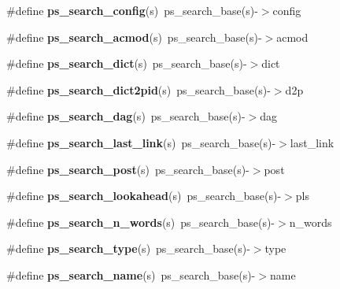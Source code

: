 \begin{DoxyCompactItemize}
\item 
\#define {\bfseries ps\-\_\-search\-\_\-config}(s)~ps\-\_\-search\-\_\-base(s)-\/$>$config\label{pocketsphinx__internal_8h_a856f984d97ce3d4ac640f1a9061065cf}

\item 
\#define {\bfseries ps\-\_\-search\-\_\-acmod}(s)~ps\-\_\-search\-\_\-base(s)-\/$>$acmod\label{pocketsphinx__internal_8h_a03b1edeb67c83451296c2d99b22621a9}

\item 
\#define {\bfseries ps\-\_\-search\-\_\-dict}(s)~ps\-\_\-search\-\_\-base(s)-\/$>$dict\label{pocketsphinx__internal_8h_ae2aad02cace01fbb2f345a0ead69c672}

\item 
\#define {\bfseries ps\-\_\-search\-\_\-dict2pid}(s)~ps\-\_\-search\-\_\-base(s)-\/$>$d2p\label{pocketsphinx__internal_8h_a5c91d7c3f11ba5b938705d1fe65676f9}

\item 
\#define {\bfseries ps\-\_\-search\-\_\-dag}(s)~ps\-\_\-search\-\_\-base(s)-\/$>$dag\label{pocketsphinx__internal_8h_a90e5addd9875c355d99208246802f7d8}

\item 
\#define {\bfseries ps\-\_\-search\-\_\-last\-\_\-link}(s)~ps\-\_\-search\-\_\-base(s)-\/$>$last\-\_\-link\label{pocketsphinx__internal_8h_a9ae7d942e4206b4184cc073a87d2dc82}

\item 
\#define {\bfseries ps\-\_\-search\-\_\-post}(s)~ps\-\_\-search\-\_\-base(s)-\/$>$post\label{pocketsphinx__internal_8h_ac8707bfd426dfd0eceb1e57836c0ac91}

\item 
\#define {\bfseries ps\-\_\-search\-\_\-lookahead}(s)~ps\-\_\-search\-\_\-base(s)-\/$>$pls\label{pocketsphinx__internal_8h_a890584ac65d28cd404d66adf631fac7c}

\item 
\#define {\bfseries ps\-\_\-search\-\_\-n\-\_\-words}(s)~ps\-\_\-search\-\_\-base(s)-\/$>$n\-\_\-words\label{pocketsphinx__internal_8h_aaba5c849ae487b5a3fff0210f4687e25}

\item 
\#define {\bfseries ps\-\_\-search\-\_\-type}(s)~ps\-\_\-search\-\_\-base(s)-\/$>$type\label{pocketsphinx__internal_8h_a0dddf728c44bd7f9e58bdacab032e9eb}

\item 
\#define {\bfseries ps\-\_\-search\-\_\-name}(s)~ps\-\_\-search\-\_\-base(s)-\/$>$name\label{pocketsphinx__internal_8h_a6ff1216eb4c0053ecdfe6096d79f02f7}


\end{DoxyCompactItemize}
